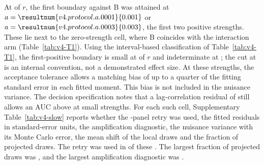 At   of $r$, the first boundary against B was attained at $a=\resultnum{v4.protocol.a.0001}{0.001}$ or $a=\resultnum{v4.protocol.a.0003}{0.003}$, the first two positive strengths. These lie next to the zero-strength cell, where B coincides with the interaction arm (Table~\ref{tab:v4-T1}). %
Using the interval-based classification of Table~\ref{tab:v4-T1}, the first-positive boundary is small at   of $r$ and indeterminate at ; the cut at  is an internal convention, not a demonstrated effect size. %
At these strengths, the acceptance tolerance allows a matching bias of up to a quarter of the fitting standard error in each fitted moment. This bias is not included in the nuisance variance. The decision specification notes that a lag-correlation residual of  still allows an AUC above  at small strengths. %
For each such cell, Supplementary Table~\ref{tab:v4-slow} reports whether the -panel retry was used, the fitted residuals in standard-error units, the amplification diagnostic, the nuisance variance with its Monte Carlo error, the mean shift of the local draws and the fraction of projected draws. %
The retry was used in  of these  . The largest fraction of projected draws was , and the largest amplification diagnostic was . %
